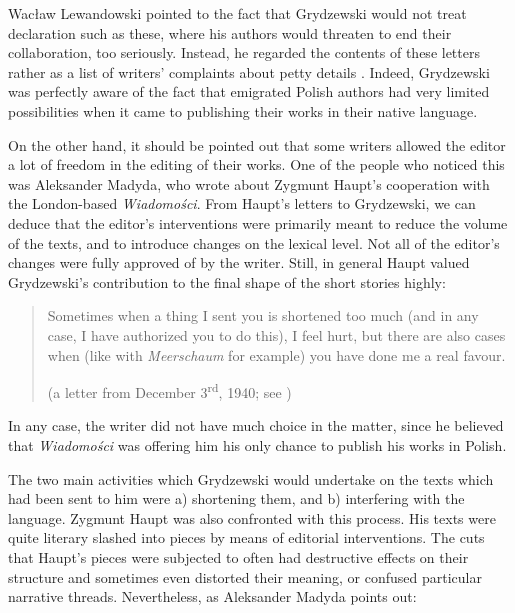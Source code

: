 \begin{paper}
\noindent Wacław Lewandowski pointed to the fact that Grydzewski would not treat
declaration such as these, where his authors would threaten to end their collaboration, too seriously. Instead, he regarded the contents of these
letters rather as a list of writers' complaints about petty
details \citep[94--95]{lewandowski_gleboki_1995}. Indeed, Grydzewski was perfectly
aware of the fact that emigrated Polish authors had very limited
possibilities when it came to publishing their works in their native language.

On the other hand, it should be pointed out that some writers allowed the editor a
lot of freedom in the editing of their works. One of the people who noticed this
was Aleksander Madyda, who wrote about Zygmunt Haupt's cooperation with the
London-based \emph{Wiadomości}. From Haupt's letters to Grydzewski, we can deduce that the editor's interventions were primarily meant to reduce
the volume of the texts, and to introduce changes on the lexical level. Not
all of the editor's changes were fully approved of by the writer. Still, in general Haupt valued Grydzewski's contribution to the final shape of the
short stories highly: 

\begin{quote}
Sometimes when a thing I sent you is shortened
too much (and in any case, I have authorized you to do this), I feel
hurt, but there are also cases when (like with \emph{Meerschaum} for
example) you have done me a real favour.
\begin{flushright}
(a letter from December 3\textsuperscript{rd}, 1940; see \citealt[64]{madyda_krytyka_1995})
\end{flushright}
\end{quote}

\noindent In any case, the writer did not have much choice in the matter, since he believed that 
\emph{Wiadomości} was offering him his only chance to publish his works in Polish.

The two main activities which Grydzewski would undertake on the
texts which had been sent to him were a) shortening them, and b) interfering
with the language. Zygmunt Haupt was also confronted with this process. His texts were quite literary slashed into pieces by means of
editorial interventions. The cuts that Haupt's pieces
were subjected to often had destructive effects on their structure and
sometimes even distorted their meaning, or confused particular narrative threads. Nevertheless, as Aleksander Madyda points out:


\end{paper}
